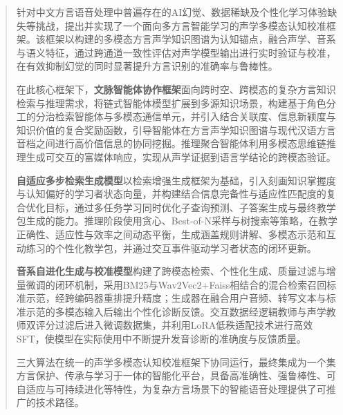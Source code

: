 

\begin{abstract}
针对中文方言语音处理中普遍存在的AI幻觉、数据稀缺及个性化学习体验缺失等挑战，提出并实现了一个面向多方言智能学习的声学多模态认知校准框架。该框架以构建的多模态方言声学知识图谱为认知锚点，融合声学、音系与语义特征，通过跨通道一致性评估对声学模型输出进行实时验证与校准，在有效抑制幻觉的同时显著提升方言识别的准确率与鲁棒性。

在此核心框架下，\textbf{文脉智能体协作框架}面向跨时空、跨模态的复杂方言知识检索与推理需求，将链式智能体模型扩展到多源知识场景，构建基于角色分工的分治检索智能体与多模态通信单元，并引入结合关联度、信息新颖度与知识价值的复合奖励函数，引导智能体在方言声学知识图谱与现代汉语方言音档之间进行高价值信息的协同挖掘。推理聚合智能体利用多模态思维链推理生成可交互的富媒体响应，实现从声学证据到语言学结论的跨模态验证。

\textbf{自适应多步检索生成模型}以检索增强生成框架为基础，引入刻画知识掌握度与认知偏好的学习者状态向量，并构建结合信息完备性与适应性匹配度的复合优化目标，通过多任务学习同时优化子查询预测、子答案生成与最终教学包生成的能力。推理阶段使用贪心、Best-of-N采样与树搜索等策略，在教学正确性、适应性与效率之间动态平衡，生成涵盖规则讲解、多模态示范和互动练习的个性化教学包，并通过交互事件驱动学习者状态的闭环更新。

\textbf{音系自进化生成与校准模型}构建了跨模态检索、个性化生成、质量过滤与增量微调的闭环机制，采用BM25与Wav2Vec2+Faiss相结合的混合检索召回标准示范，经跨编码器重排提升精度；生成器在融合用户音频、转写文本与标准示范的多模态输入后输出个性化诊断反馈。交互数据经逻辑教师与声学教师双评分过滤后进入微调数据集，并利用LoRA低秩适配技术进行高效SFT，使模型在实际使用中不断提升发音诊断的准确度与反馈质量。

三大算法在统一的声学多模态认知校准框架下协同运行，最终集成为一个集方言保护、传承与学习于一体的智能化平台，具备高准确性、强鲁棒性、可自适应与可持续进化等特性，为复杂方言场景下的智能语音处理提供了可推广的技术路径。
\end{abstract}

